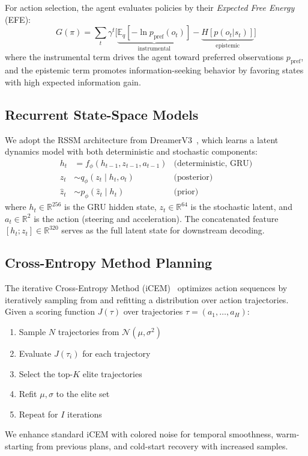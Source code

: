 \documentclass[conference]{IEEEtran}
\begin{document}
For action selection, the agent evaluates policies by their \emph{Expected Free Energy} (EFE):
\begin{equation}
    G(\pi) = \sum_{t} \gamma^t \Big[ \underbrace{\mathbb{E}_{q}[-\ln p_{\text{pref}}(o_t)]}_{\text{instrumental}} - \underbrace{H[p(o_t | s_t)]}_{\text{epistemic}} \Big]
\label{eq:efe_general}
\end{equation}
where the instrumental term drives the agent toward preferred observations $p_{\text{pref}}$, and the epistemic term promotes information-seeking behavior by favoring states with high expected information gain.

\subsection{Recurrent State-Space Models}

We adopt the RSSM architecture from DreamerV3~\cite{hafner2023mastering}, which learns a latent dynamics model with both deterministic and stochastic components:
\begin{align}
    h_t &= f_\phi(h_{t-1}, z_{t-1}, a_{t-1}) & \text{(deterministic, GRU)} \\
    z_t &\sim q_\phi(z_t \mid h_t, o_t) & \text{(posterior)} \\
    \hat{z}_t &\sim p_\phi(\hat{z}_t \mid h_t) & \text{(prior)}
\end{align}
where $h_t \in \mathbb{R}^{256}$ is the GRU hidden state, $z_t \in \mathbb{R}^{64}$ is the stochastic latent, and $a_t \in \mathbb{R}^2$ is the action (steering and acceleration). The concatenated feature $[h_t; z_t] \in \mathbb{R}^{320}$ serves as the full latent state for downstream decoding.

\subsection{Cross-Entropy Method Planning}

The iterative Cross-Entropy Method (iCEM)~\cite{pinneri2021sample} optimizes action sequences by iteratively sampling from and refitting a distribution over action trajectories. Given a scoring function $J(\tau)$ over trajectories $\tau = (a_1, \ldots, a_H)$:
\begin{enumerate}
    \item Sample $N$ trajectories from $\mathcal{N}(\mu, \sigma^2)$
    \item Evaluate $J(\tau_i)$ for each trajectory
    \item Select the top-$K$ elite trajectories
    \item Refit $\mu, \sigma$ to the elite set
    \item Repeat for $I$ iterations
\end{enumerate}
We enhance standard iCEM with colored noise for temporal smoothness, warm-starting from previous plans, and cold-start recovery with increased samples.
\end{document}
